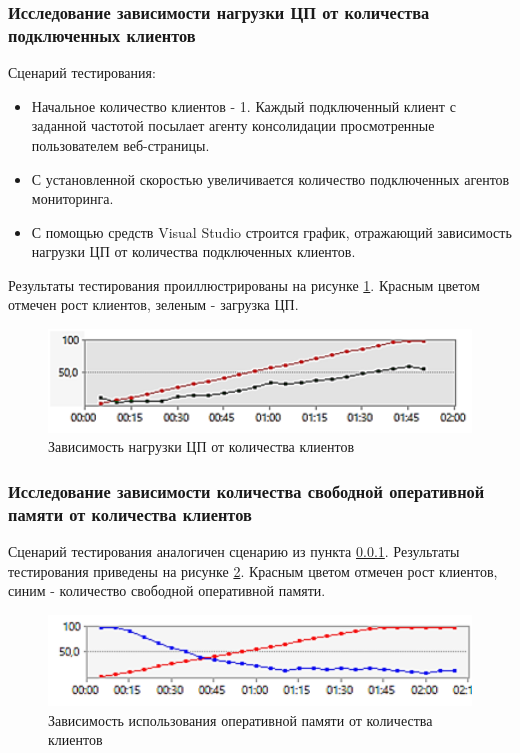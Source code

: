 \documentclass[russian, utf8, emptystyle]{eskdtext}
\begin{document}
\subsubsection {Исследование зависимости нагрузки ЦП от количества подключенных клиентов}
\label{test1}
Сценарий тестирования:
\begin{itemize}
	\item Начальное количество клиентов - 1. Каждый подключенный клиент с заданной частотой посылает агенту консолидации просмотренные пользователем веб-страницы.
	\item С установленной скоростью увеличивается количество подключенных агентов мониторинга.
	\item С помощью средств Visual Studio строится график, отражающий зависимость нагрузки ЦП от количества подключенных клиентов.
\end{itemize}

Результаты тестирования проиллюстрированы на рисунке \ref{fig:test1}. Красным цветом отмечен рост клиентов, зеленым - загрузка ЦП.
 \begin{figure}[h]
 	\begin{center}
 		\includegraphics[width=12cm]{pic/test1.png}
 		\caption{Зависимость нагрузки ЦП от количества клиентов}
 		\label{fig:test1}
 	\end{center}
 \end{figure}
 
\subsubsection{Исследование зависимости количества свободной оперативной памяти от количества клиентов}

Сценарий тестирования аналогичен сценарию из пункта \ref{test1}.
Результаты тестирования приведены на рисунке \ref{fig:test2}. Красным цветом отмечен рост клиентов, синим - количество свободной оперативной памяти.
\begin{figure}[h]
	\begin{center}
		\includegraphics[width=12cm]{pic/test2.png}
		\caption{Зависимость использования оперативной памяти от количества клиентов}
		\label{fig:test2}
	\end{center}
\end{figure}
\end{document}
